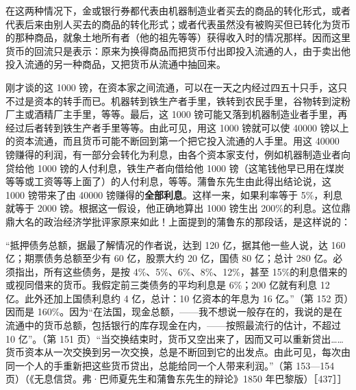在这两种情况下，金或银行券都代表由机器制造业者买去的商品的转化形式，或者代表后来由别人买去的商品的转化形式；或者代表虽然没有被购买但已转化为货币的那种商品，就象土地所有者（他的祖先等等）获得收入时的情况那样。因而这里货币的回流只是表示：原来为换得商品而把货币付出即投入流通的人，由于卖出他投入流通的另一种商品，又把货币从流通中抽回来。

刚才谈的这 1000 镑，在资本家之间流通，可以在一天之内经过四五十只手，这只不过是资本的转手而已。机器转到铁生产者手里，铁转到农民手里，谷物转到淀粉厂主或酒精厂主手里，等等。最后，这 1000 镑可能又落到机器制造业者手里，再经过后者转到铁生产者手里等等。由此可见，用这 1000 镑就可以使 40000 镑以上的资本流通，而且货币可能不断回到第一个把它投入流通的人手里。用这 40000 镑赚得的利润，有一部分会转化为利息，由各个资本家支付，例如机器制造业者向贷给他 1000 镑的人付利息，铁生产者向借给他 1000 镑（这笔钱他早已用在煤炭等等或工资等等上面了）的人付利息，等等。蒲鲁东先生由此得出结论说，这 1000 镑带来了由 40000 镑赚得的\textbf{全部利息}。这样一来，如果利率等于 5\%，利息就等于 2000 镑。根据这一假设，他正确地算出 1000 镑生出 200\%的利息。这位鼎鼎大名的政治经济学批评家原来如此！上面提到的蒲鲁东的那段话，是这样说的：

“抵押债务总额，据最了解情况的作者说，达到 120 亿，据其他一些人说，达 160 亿；期票债务总额至少有 60 亿，股票大约 20 亿，国债 80 亿；总计 280 亿。必须指出，所有这些债务，是按 4\%、5\%、6\%、8\%、12\%，甚至 15\%的利息借来的或视同借来的货币。我假定前三类债务的平均利息是 6\%；200 亿就有利息 12 亿。此外还加上国债利息约 4 亿，总计：10 亿资本的年息为 16 亿。”（第 152 页）因而是 160\%。因为“在法国，现金总额，——我不想说一般存在的，我说的是在流通中的货币总额，包括银行的库存现金在内，——按照最流行的估计，不超过 10 亿”。（第 151 页）“当交换结束时，货币又空出来了，因而又可以重新贷出……货币资本从一次交换到另一次交换，总是不断回到它的出发点。由此可见，每次由同一个人的手重新把这些货币贷出，总能给同一个人带来利润。”（第 153—154 页）（《无息信贷。弗·巴师夏先生和蒲鲁东先生的辩论》1850 年巴黎版）［437］］

